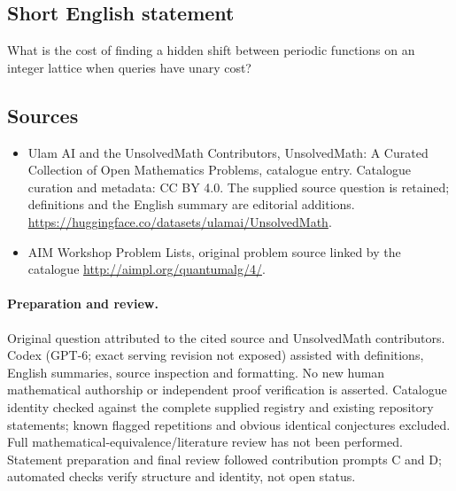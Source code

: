 \documentclass[11pt]{article}
\begin{document}
\subsection{Short English statement}
What is the cost of finding a hidden shift between periodic functions on an integer lattice when queries have unary cost?
\subsection{Sources}
\begin{itemize}
\item[\hypertarget{source:statement:1}{S1}] Ulam AI and the UnsolvedMath Contributors, UnsolvedMath: A Curated Collection of Open Mathematics Problems, catalogue entry. Catalogue curation and metadata: CC BY 4.0. The supplied source question is retained; definitions and the English summary are editorial additions.
\url{https://huggingface.co/datasets/ulamai/UnsolvedMath}.
\item[\hypertarget{source:statement:2}{S2}] AIM Workshop Problem Lists, original problem source linked by the catalogue
\url{http://aimpl.org/quantumalg/4/}.
\end{itemize}
\paragraph{Preparation and review.}
Original question attributed to the cited source and UnsolvedMath contributors. Codex (GPT-6; exact serving revision not exposed) assisted with definitions, English summaries, source inspection and formatting. No new human mathematical authorship or independent proof verification is asserted. Catalogue identity checked against the complete supplied registry and existing repository statements; known flagged repetitions and obvious identical conjectures excluded. Full mathematical-equivalence/literature review has not been performed. Statement preparation and final review followed contribution prompts C and D; automated checks verify structure and identity, not open status.
\label{end:statement}
\end{document}
